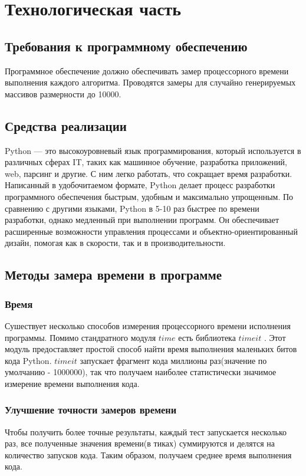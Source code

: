 \documentclass[a4paper]{article}
\begin{document}
	
	\section{Технологическая часть}
	\subsection{Требования к программному обеспечению}
	Программное обеспечение должно обеспечивать замер процессорного времени выполнения каждого алгоритма. Проводятся замеры для случайно генерируемых массивов размерности до 10000.
	
	\subsection{Средства реализации}
	Python\cite{what_is_python} — это высокоуровневый язык программирования, который используется в различных сферах IT, таких как машинное обучение, разработка приложений, web, парсинг и другие.
	С ним легко работать, что сокращает время разработки. Написанный в удобочитаемом формате, Python делает процесс разработки программного обеспечения быстрым, удобным и максимально упрощенным.
	По сравнению с другими языками, Python в 5-10 раз быстрее по времени разработки, однако медленный при выполнении программ. Он обеспечивает расширенные возможности управления процессами и объектно-ориентированный дизайн, помогая как в скорости, так и в производительности.
	\clearpage
	
	\subsection{Методы замера времени в программе}
	\subsubsection{Время}
	Сушествует несколько способов измерения процессорного времени исполнения программы. 
	Помимо стандратного модуля $time$ есть библиотека $timeit$ \cite{timeit}. Этот модуль предоставляет простой способ найти время выполнения маленьких битов кода Python.
	$timeit$ запускает фрагмент кода миллионы раз(значение по умолчанию - 1000000), так что получаем наиболее статистически значимое измерение времени выполнения кода.
	
	\subsubsection{Улучшение точности замеров времени} Чтобы получить более точные результаты, каждый тест запускается несколько раз, все полученные значения времени(в тиках) суммируются и делятся на количество запусков кода. Таким образом, получаем среднее время выполнения кода.
	\clearpage
\end{document}
